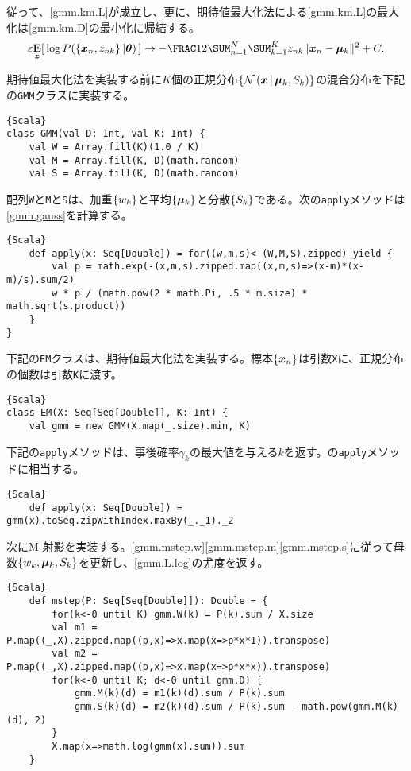 \documentclass[10pt,a4paper]{book}
\begin{document}
従って、\eqref{gmm.km.L}が成立し、更に、期待値最大化法による\eqref{gmm.km.L}の最大化は\eqref{gmm.km.D}の最小化に帰結する。
%
\begin{equation}
\label{eq:gmm.km.L}
\varepsilon \E[\bm{z}]{\log P(\seq{\bm{x}_n,z_{nk}}|\bm{\theta})} \to -\frac{1}{2} \sum_{n=1}^N \sum_{k=1}^K z_{nk} \|\bm{x}_n-\bm{\mu}_k\|^2 + C.
\end{equation}

期待値最大化法を実装する前に$K$個の正規分布$\seq{\Nd{\bm{x}}{\bm{\mu}_k,S_k}}$の混合分布を下記の\texttt{GMM}クラスに実装する。

\begin{Verbatim}{Scala}
class GMM(val D: Int, val K: Int) {
	val W = Array.fill(K)(1.0 / K)
	val M = Array.fill(K, D)(math.random)
	val S = Array.fill(K, D)(math.random)
\end{Verbatim}

配列\texttt{W}と\texttt{M}と\texttt{S}は、加重$\seq{w_k}$と平均$\seq{\bm{\mu}_k}$と分散$\seq{S_k}$である。次の\texttt{apply}メソッドは\eqref{gmm.gauss}を計算する。

\begin{Verbatim}{Scala}
	def apply(x: Seq[Double]) = for((w,m,s)<-(W,M,S).zipped) yield {
		val p = math.exp(-(x,m,s).zipped.map((x,m,s)=>(x-m)*(x-m)/s).sum/2)
		w * p / (math.pow(2 * math.Pi, .5 * m.size) * math.sqrt(s.product))
	}
}
\end{Verbatim}

下記の\texttt{EM}クラスは、期待値最大化法を実装する。標本$\seq{\bm{x}_n}$は引数\texttt{X}に、正規分布の個数は引数\texttt{K}に渡す。

\begin{Verbatim}{Scala}
class EM(X: Seq[Seq[Double]], K: Int) {
	val gmm = new GMM(X.map(_.size).min, K)
\end{Verbatim}

下記の\texttt{apply}メソッドは、事後確率$\gamma_k$の最大値を与える$k$を返す。の\texttt{apply}メソッドに相当する。

\begin{Verbatim}{Scala}
	def apply(x: Seq[Double]) = gmm(x).toSeq.zipWithIndex.maxBy(_._1)._2
\end{Verbatim}

次にM-射影を実装する。\eqref{gmm.mstep.w}\eqref{gmm.mstep.m}\eqref{gmm.mstep.s}に従って母数$\seq{w_k,\bm{\mu}_k,S_k}$を更新し、\eqref{gmm.L.log}の尤度を返す。

\begin{Verbatim}{Scala}
	def mstep(P: Seq[Seq[Double]]): Double = {
		for(k<-0 until K) gmm.W(k) = P(k).sum / X.size
		val m1 = P.map((_,X).zipped.map((p,x)=>x.map(x=>p*x*1)).transpose)
		val m2 = P.map((_,X).zipped.map((p,x)=>x.map(x=>p*x*x)).transpose)
		for(k<-0 until K; d<-0 until gmm.D) {
			gmm.M(k)(d) = m1(k)(d).sum / P(k).sum
			gmm.S(k)(d) = m2(k)(d).sum / P(k).sum - math.pow(gmm.M(k)(d), 2)
		}
		X.map(x=>math.log(gmm(x).sum)).sum
	}
\end{Verbatim}
\end{document}
